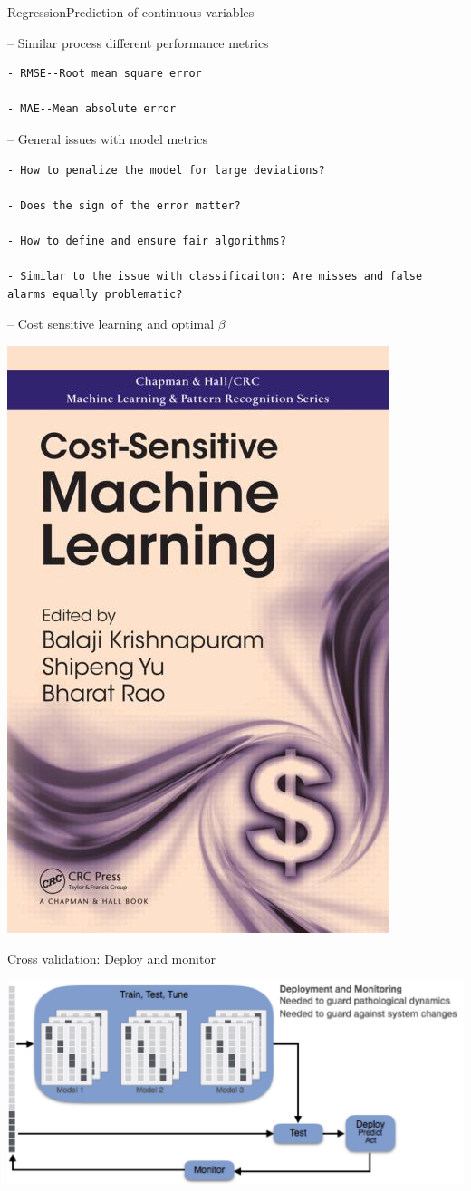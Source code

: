 \documentclass[ignorenonframetext,]{beamer}
\begin{document}
\begin{frame}[fragile]{Regression\textbar{}Prediction of continuous
variables}

-- Similar process different performance metrics

\begin{verbatim}
- RMSE--Root mean square error

- MAE--Mean absolute error
\end{verbatim}

-- General issues with model metrics

\begin{verbatim}
- How to penalize the model for large deviations?

- Does the sign of the error matter?

- How to define and ensure fair algorithms?

- Similar to the issue with classificaiton: Are misses and false alarms equally problematic?
\end{verbatim}

 -- Cost sensitive learning and optimal \(\beta\)

\includegraphics[width=0.45\linewidth]{CostSensitveML}

\end{frame}

\begin{frame}{Cross validation: Deploy and monitor}

\includegraphics[width=10.28in]{4.DeployMonitor}

\end{frame}
\end{document}
